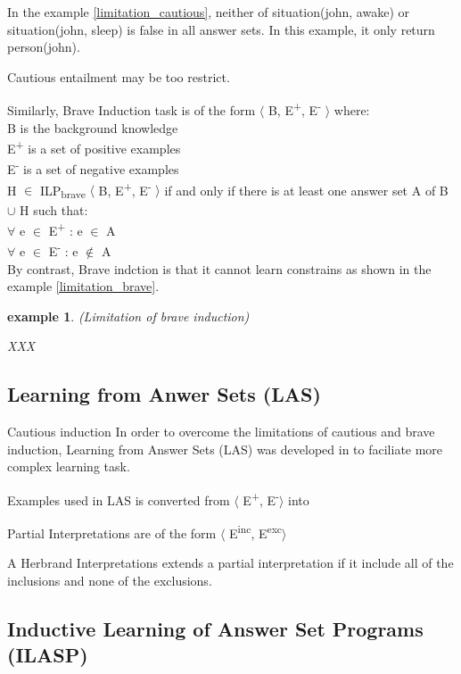 \documentclass[12pt,twoside]{report}
\newtheorem{examp}{example}[section]
\begin{document}
In the example \ref{limitation_cautious}, neither of situation(john, awake) or situation(john, sleep) is false in all answer sets. In this example, it only return person(john).

Cautious entailment may be too restrict.

Similarly, Brave Induction task is of the form $\langle$ B, E\textsuperscript{+}, E\textsuperscript{-} $\rangle$ where: \\
B is the background knowledge \\
E\textsuperscript{+} is a set of positive examples \\
E\textsuperscript{-} is a set of negative examples \\

 H $\in$ ILP\textsubscript{brave} $\langle$ B, E\textsuperscript{+}, E\textsuperscript{-} $\rangle$ if and only if there is at least one answer set A of B $\cup$ H such that: \\
$\forall$ e $\in$ E\textsuperscript{+} : e $\in$ A \\
$\forall$ e $\in$ E\textsuperscript{-} : e $\notin$ A \\


By contrast, Brave indction is that it cannot learn constrains as shown in the example \ref{limitation_brave}.

\begin{examp} (Limitation of brave induction)

XXX
\end{examp}
\label{limitation_brave}

\subsection{Learning from Anwer Sets (LAS)}

Cautious induction In order to overcome the limitations of cautious and brave induction,
Learning from Answer Sets (LAS) was developed in \cite{Law2014} to faciliate more complex learning task.

Examples used in LAS is converted from $\langle$ E\textsuperscript{+}, E\textsuperscript{-}$\rangle$ into

Partial Interpretations are of the form $\langle$ E\textsuperscript{inc}, E\textsuperscript{exc}$\rangle$

A Herbrand Interpretations extends a partial interpretation if it include all of the inclusions and none of the exclusions.

\subsection{Inductive Learning of Answer Set Programs (ILASP)}
\end{document}

